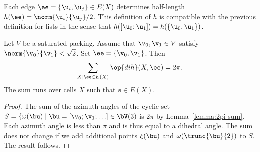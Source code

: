 Each
edge $\ee=\{ \u_i, \u_j\}\in E(X)$ determines half-length
$h(\ee) = \norm{ \u_i}{ \u_j}/2$.
This definition of $h$ is compatible with the previous definition for lists in the sense that
$h([\u_0;\u_1]) = h(\{\u_0,\u_1\})$.

\begin{lemma}
Let $V$ be a saturated packing.  Assume that $\v_0,\v_1\in V$ satisfy $\norm{\v_0}{\v_1}<\sqrt2$.  Set $\ee=\{\v_0,\v_1\}$.
Then
\[
\sum_{X\mid \ee\in E(X) } \op{dih}(X,\ee) = 2\pi.
\]
The sum runs over cells $X$ such that $\ee\in E(X)$.
\end{lemma}

\begin{proof} 
The sum of the azimuth angles of the cyclic set 
$S=\{\omega(\bu) \mid \bu =[\v_0;\v_1;\ldots]\in \bV(3)$ is $2\pi$
by Lemma~\ref{lemma:2pi-sum}.   Each azimuth angle is less than $\pi$ and is thus
equal to a dihedral angle.  The sum does not change if we add additional points
$\xi(\bu)$ and $\omega(\trunc{\bu}{2})$ to $S$.  The result follows.
\end{proof}
%




